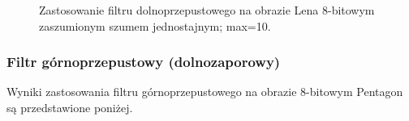 \documentclass{classrep}
\begin{document}
\begin{figure}[H]
    \qquad
    \qquad
    \qquad
    \caption{Zastosowanie filtru dolnoprzepustowego na obrazie Lena 8-bitowym zaszumionym szumem jednostajnym; max=10.}%
\end{figure}  

\subsubsection{Filtr górnoprzepustowy (dolnozaporowy)}
Wyniki zastosowania filtru górnoprzepustowego na obrazie 8-bitowym Pentagon są przedstawione poniżej. 
\end{document}
